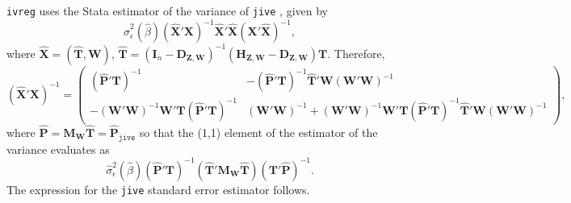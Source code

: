 \documentclass{mynotes}
\newcommand{\bx}{\mathbf{X}} %
\newcommand{\bt}{\mathbf{T}} %
\newcommand{\bz}{\mathbf{Z}} %
\newcommand{\bp}{\mathbf{P}} %
\newcommand{\bw}{\mathbf{W}} %
\newcommand{\eye}{\mathbf{I}} %
\newcommand{\Hm}[1]{\mathbf{H}_{#1}} %
\newcommand{\Dm}[1]{\mathbf{D}_{#1}} %
\newcommand{\Mm}[1]{\mathbf{M}_{#1}} %
\begin{document}
\begin{appendices}
\lstinline!ivreg! uses the Stata estimator of the variance of \texttt{jive}
\citep{poi06}, given by
\begin{equation*}
    \hat{\sigma}^{2}_{\epsilon}(\hat{\beta})(\hat{\bx}'\bx)^{-1}\hat{\bx}'\hat{\bx}(\bx'\hat{\bx})^{-1},
\end{equation*}
where $\hat{\bx}=(\hat{\bt},\bw)$,
$\hat{\bt}=(\eye_{n}-\Dm{\bz,\bw})^{-1}(\Hm{\bz,\bw}-\Dm{\bz,\bw})\bt$.
Therefore,
\begin{equation*}
  (\hat{\bx}'\bx)^{-1}=
  \begin{pmatrix}
    (\hat{\bp}'\bt)^{-1}&-
    (\hat{\bp}'\bt)^{-1}\hat{\bt}'\bw(\bw'\bw)^{-1}\\
    -(\bw'\bw)^{-1} \bw'\bt(\hat{\bp}'\bt)^{-1}& (\bw'\bw)^{-1}+(\bw'\bw)^{-1}
    \bw'\bt (\hat{\bp}'\bt)^{-1} \hat{\bt}'\bw(\bw'\bw)^{-1}
  \end{pmatrix},
\end{equation*}
where $\hat{\bp}=\Mm{\bw}\hat{\bt}=\hat{\bp}_{\mathtt{jive}}$ so that the (1,1)
element of the estimator of the variance evaluates as
\begin{equation*}
    \hat{\sigma}^{2}_{\epsilon}(\hat{\beta})(\hat{\bp}'\bt)^{-1}  (\hat{\bt}'\Mm{\bw}\hat{\bt})(\bt'\hat{\bp})^{-1}.
\end{equation*}
The expression for the \texttt{jive} standard error estimator follows.



\end{appendices}
\end{document}

